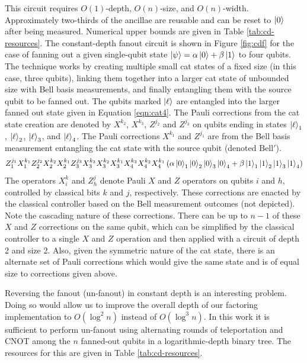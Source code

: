 \documentclass[twoside]{article}
\begin{document}
This circuit requires $O(1)$-depth, $O(n)$-size, and $O(n)$-width. Approximately
two-thirds of the ancillae are reusable and can be reset to $\left\vert{0}\right\rangle$ after
being measured. Numerical upper bounds are given in Table \ref{tab:cd-resources}.
The constant-depth fanout circuit is shown in Figure \ref{fig:cdf} for the case of fanning out a given single-qubit state
$\left\vert{\psi}\right\rangle = \alpha\left\vert{0}\right\rangle + \beta\left\vert{1}\right\rangle$ to four qubits.
The technique works by creating multiple small
cat states of a fixed size (in this case, three qubits), linking them
together into a larger cat state of unbounded size with Bell basis measurements,
and finally entangling them with the source qubit to be fanned out.
The qubits marked $\left\vert{\ell}\right\rangle$ are
entangled into the larger fanned out state given in Equation \ref{eqn:cat4}.
The Pauli corrections from the cat state creation are denoted by
$X^{k_2}$, $X^{k_3}$, $Z^{j_2}$ and $Z^{j_3}$ on qubits ending in
states $\left\vert{\ell}\right\rangle_1$, $\left\vert{\ell}\right\rangle_2$,
$\left\vert{\ell}\right\rangle_3$, and $\left\vert{\ell}\right\rangle_4$. The Pauli corrections
$X^{k_1}$ and $Z^{j_1}$ are from the Bell basis measurement
entangling the cat state with the source qubit (denoted $\text{Bell}'$).
\begin{equation}
Z_1^{j_1}X_1^{k_1}Z_2^{j_2}X_2^{k_2}X_2^{k_1}Z_{3}^{j_3}X_{3}^{k_3}X_{3}^{k_2}X_{3}^{k_1}X_{4}^{k_3}X_{4}^{k_2}X_{4}^{k_1}
\left(\alpha \left\vert{0}\right\rangle_1\left\vert{0}\right\rangle_2\left\vert{0}\right\rangle_3\left\vert{0}\right\rangle_4 + \beta \left\vert{1}\right\rangle_1\left\vert{1}\right\rangle_2\left\vert{1}\right\rangle_3\left\vert{1}\right\rangle_4 \right)
\label{eqn:cat4}
\end{equation}
%
The operators $X^k_i$ and $Z^j_{h}$ denote Pauli $X$ and $Z$ operators
on qubits $i$ and $h$, controlled by classical bits $k$ and $j$,
respectively. These corrections are enacted by the classical controller based on
the Bell measurement outcomes (not depicted).
Note the cascading nature of these corrections.
There can be up to
$n-1$ of these $X$ and $Z$
corrections on the same qubit, which can be simplified by the classical
controller to a single $X$ and $Z$ operation and then applied with a circuit of
depth 2 and size 2. Also, given the symmetric nature of the cat state, there
is an alternate set of Pauli corrections which would give the same state and
is of equal size to corrections given above.

Reversing the fanout (un-fanout) in constant depth is an interesting
problem. Doing so would allow us to improve the overall depth of our
factoring implementation to $O(\log^2 n)$ instead of $O(\log^3 n )$.
In this work it is sufficient to perform un-fanout using alternating rounds of
teleportation and CNOT among the $n$ fanned-out qubits in a logarithmic-depth
binary tree. The resources for this are given in
Table \ref{tab:cd-resources}.
\end{document}
